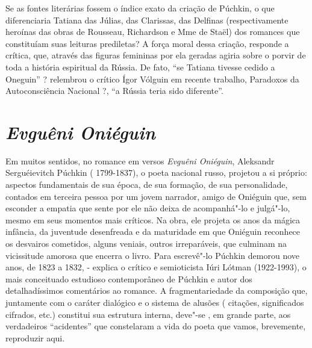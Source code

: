 Se as fontes literárias fossem o índice exato da criação de Púchkin, o
que diferenciaria Tatiana das Júlias, das Clarissas, das Delfinas
(respectivamente heroínas das obras de Rousseau, Richardson e Mme de
Staël) dos romances que constituíam suas leituras prediletas? A força
moral dessa criação, responde a crítica, que, através das figuras
femininas por ela geradas agiria sobre o porvir de toda a história
espiritual da Rússia. De fato, ``se Tatiana tivesse cedido a Oneguin'' ?
relembrou o crítico Ígor Vólguin em recente trabalho, Paradoxos da
Autoconsciência Nacional ?, ``a Rússia teria sido diferente''.

\chapter{\emph{Evguêni Oniéguin}}

Em muitos sentidos, no romance em versos \emph{Evguêni Oniéguin},
Aleksandr Serguéievitch Púchkin ( 1799-1837), o poeta nacional russo,
projetou a si próprio: aspectos fundamentais de sua época, de sua
formação, de sua personalidade, contados em terceira pessoa por um jovem
narrador, amigo de Oniéguin que, sem esconder a empatia que sente por
ele não deixa de acompanhá"-lo e julgá"-lo, mesmo em seus momentos mais
críticos. Na obra, ele projeta os anos da mágica infância, da juventude
desenfreada e da maturidade em que Oniéguin reconhece os desvairos
cometidos, alguns veniais, outros irreparáveis, que culminam na
vicissitude amorosa que encerra o livro. Para escrevê"-lo Púchkin demorou
nove anos, de 1823 a 1832, - explica o crítico e semioticista Iúri
Lótman (1922-1993), o mais conceituado estudioso contemporâneo de
Púchkin e autor dos detalhadíssimos comentários ao romance. A
fragmentariedade da composição que, juntamente com o caráter dialógico e
o sistema de alusões ( citações, significados cifrados, etc.) constitui
sua estrutura interna, deve"-se , em grande parte, aos verdadeiros
``acidentes'' que constelaram a vida do poeta que vamos, brevemente,
reproduzir aqui.

